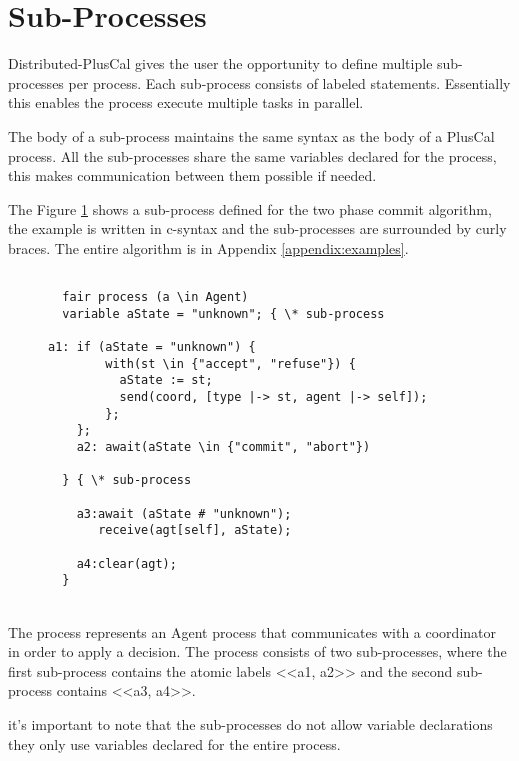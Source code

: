 \documentclass{thesul}
\begin{document}
\section{Sub-Processes}
\label{subProcess}

Distributed-PlusCal gives the user the opportunity to define multiple sub-processes per process. Each sub-process consists of labeled statements. Essentially this enables the process execute multiple tasks in parallel.

The body of a sub-process maintains the same syntax as the body of a PlusCal process. All the sub-processes share the same variables declared for the process, this makes communication between them possible if needed.

The Figure \ref{2pcSub} shows a sub-process defined for the two phase commit algorithm, the example is written in c-syntax and the sub-processes are surrounded by curly braces.
The entire algorithm is in Appendix \ref{appendix:examples}.

\begin{figure}[!h]
\label{2pcSub}
\begin{lstlisting}[caption = Distributed-PlusCal Sub-Processes, frame = tlrb, firstnumber = 1]
   
  fair process (a \in Agent)
  variable aState = "unknown"; { \* sub-process

a1: if (aState = "unknown") {
        with(st \in {"accept", "refuse"}) {
          aState := st;
          send(coord, [type |-> st, agent |-> self]);
        };
    };
    a2: await(aState \in {"commit", "abort"})
    
  } { \* sub-process
    
    a3:await (aState # "unknown");
       receive(agt[self], aState); 
       
    a4:clear(agt);
  }

\end{lstlisting}
\end{figure}

\hfill\\

The process represents an Agent process that communicates with a coordinator in order to apply a decision. The process consists of two sub-processes, where the first sub-process contains the atomic labels <<a1, a2>> and the second sub-process contains <<a3, a4>>.

it's important to note that the sub-processes do not allow variable declarations they only use variables declared for the entire process.
\end{document}
